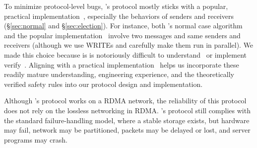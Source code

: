 % 
To minimize protocol-level bugs, 
\xxx's \paxos protocol mostly sticks with a popular, 
practical implementation~\cite{paxos:practical}, especially the behaviors of 
senders and receivers (\S\ref{sec:normal} and \S\ref{sec:election}). For 
instance, both \xxx's normal case algorithm and 
the popular implementation~\cite{paxos:practical} involve two messages and 
same senders and receivers (although we use WRITEs and carefully make them run 
in parallel). We made this choice 
because \paxos is \paxos is notoriously difficult to 
understand~\cite{raft:usenix14,paxos:simple,paxos,paxos:complex} or 
implement~\cite{paxos:live,paxos:practical} 
verify~\cite{modist:nsdi09,demeter:sosp11}. Aligning with a practical
\paxos implementation~\cite{paxos:practical} helps us incorporate these 
readily mature understanding, engineering experience, and the theoretically 
verified safety rules into our protocol design and implementation.

Although \xxx's \paxos protocol works on a RDMA network, the reliability of 
this protocol does not rely on the lossless networking in RDMA. \xxx's protocol 
still complies with the standard \paxos failure-handling model, where a stable 
storage exists, but hardware may fail, network may be partitioned, packets may 
be delayed or lost, and server programs may crash.



